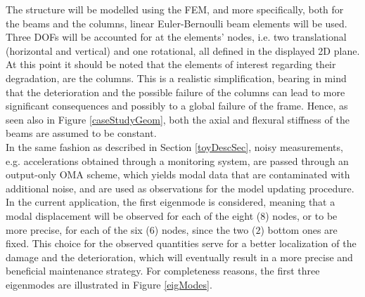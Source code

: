 The structure will be modelled using the \gls{FEM}, and more specifically, both for the beams and the columns, linear Euler-Bernoulli beam elements will be used. Three \glspl{DOF} will be accounted for at the elements' nodes, i.e. two translational (horizontal and vertical) and one rotational, all defined in the displayed 2D plane. At this point it should be noted that the elements of interest regarding their degradation, are the columns. This is a realistic simplification, bearing in mind that the deterioration and the possible failure of the columns can lead to more significant consequences and possibly to a global failure of the frame. Hence, as seen also in Figure \ref{caseStudyGeom}, both the axial and flexural stiffness of the beams are assumed to be constant. \\

In the same fashion as described in Section \ref{toyDescSec}, noisy measurements, e.g. accelerations obtained through a monitoring system, are passed through an output-only \gls{OMA} scheme, which yields modal data that are contaminated with additional noise, and are used as observations for the model updating procedure. In the current application, the first eigenmode is considered, meaning that a modal displacement will be observed for each of the eight ($8$) nodes, or to be more precise, for each of the six ($6$) nodes, since the two ($2$) bottom ones are fixed. This choice for the observed quantities serve for a better localization of the damage and the deterioration, which will eventually result in a more precise and beneficial maintenance strategy. For completeness reasons, the first three eigenmodes are illustrated in Figure \ref{eigModes}. 

